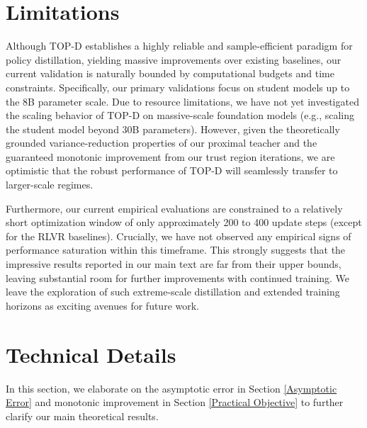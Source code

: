 \documentclass{article}
\theoremstyle{plain}
\theoremstyle{definition}
\theoremstyle{remark}
\begin{document}
\section*{Limitations}
Although TOP-D establishes a highly reliable and sample-efficient paradigm for policy distillation, yielding massive improvements over existing baselines, our current validation is naturally bounded by computational budgets and time constraints. Specifically, our primary validations focus on student models up to the 8B parameter scale. Due to resource limitations, we have not yet investigated the scaling behavior of TOP-D on massive-scale foundation models (e.g., scaling the student model beyond 30B parameters). However, given the theoretically grounded variance-reduction properties of our proximal teacher and the guaranteed monotonic improvement from our trust region iterations, we are optimistic that the robust performance of TOP-D will seamlessly transfer to larger-scale regimes. 

Furthermore, our current empirical evaluations are constrained to a relatively short optimization window of only approximately 200 to 400 update steps (except for the RLVR baselines). Crucially, we have not observed any empirical signs of performance saturation within this timeframe. This strongly suggests that the impressive results reported in our main text are far from their upper bounds, leaving substantial room for further improvements with continued training. We leave the exploration of such extreme-scale distillation and extended training horizons as exciting avenues for future work.




\section{Technical Details}
In this section, we elaborate on the asymptotic error in Section \ref{Asymptotic Error} and monotonic improvement in Section \ref{Practical Objective} to further clarify our main theoretical results.
\end{document}
